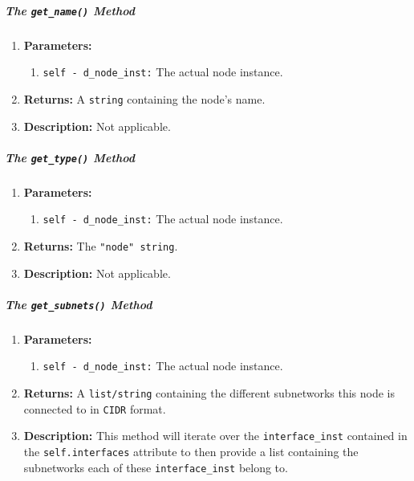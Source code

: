                     \subparagraph{The \texttt{get\_name()} Method}
                        \begin{enumerate}
                            \item \textbf{Parameters:}
                            \begin{enumerate}
                                \item \texttt{self - d\_node\_inst:} The actual node instance.
                            \end{enumerate}
                            \item \textbf{Returns:} A \texttt{string} containing the node's name.
                            \item \textbf{Description:} Not applicable.
                        \end{enumerate}

                    \subparagraph{The \texttt{get\_type()} Method}
                        \begin{enumerate}
                            \item \textbf{Parameters:}
                            \begin{enumerate}
                                \item \texttt{self - d\_node\_inst:} The actual node instance.
                            \end{enumerate}
                            \item \textbf{Returns:} The \texttt{"node" string}.
                            \item \textbf{Description:} Not applicable.
                        \end{enumerate}

                    \subparagraph{The \texttt{get\_subnets()} Method}
                        \begin{enumerate}
                            \item \textbf{Parameters:}
                            \begin{enumerate}
                                \item \texttt{self - d\_node\_inst:} The actual node instance.
                            \end{enumerate}
                            \item \textbf{Returns:} A \texttt{list/string} containing the different subnetworks this node is connected to in \texttt{CIDR} format.
                            \item \textbf{Description:} This method will iterate over the \texttt{interface\_inst} contained in the \texttt{self.interfaces} attribute to then provide a list containing the subnetworks each of these \texttt{interface\_inst} belong to.
                        \end{enumerate}

